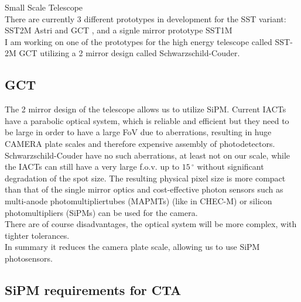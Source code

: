 \documentclass[12pt,article,type=msc,colorback,accentcolor=tud9c]{tudthesis}
\begin{document}
Small Scale Telescope\\
There are currently 3 different prototypes in development for the SST variant: SST2M Astri and GCT , and a signle mirror prototype SST1M\\
I am working on one of the prototypes for the high energy telescope called SST-2M GCT utilizing a 2 mirror design called Schwarzschild-Couder.

\newpage
\subsection{GCT}
\begin{wrapfigure}{R}{0.5\textwidth}
\centering
\texttt{[image: D:/OwnCloudData/00\_WriteUP/04\_Thesis/Pic/Proposal/Fig/\{Bild1]}.png}
\caption{\label{fig:SCO}Schwarzschild-Couder Optics}
\end{wrapfigure}

The 2 mirror design of the telescope allows us to utilize SiPM. Current IACTs have a parabolic optical system, which is reliable and efficient but they need to be large in order to have a large FoV due to aberrations, resulting in huge CAMERA plate scales and therefore expensive assembly of photodetectors.\\

Schwarzschild-Couder have no such aberrations, at least not on our scale, while the IACTs can still have a very large f.o.v. up to $15\,^{\circ}$ without significant degradation of the spot size. The resulting physical pixel size is more compact than that of the single mirror optics and cost-effective  photon sensors such as multi-anode photomultipliertubes (MAPMTs) (like in CHEC-M) or silicon photomultipliers (SiPMs) can be used
for the camera.\\
There are of course disadvantages, the optical system will be more complex, with tighter tolerances.\\

In summary it reduces the camera plate scale, allowing us to use SiPM photosensors.


\subsection{SiPM requirements for CTA}



\newpage
\end{document}
